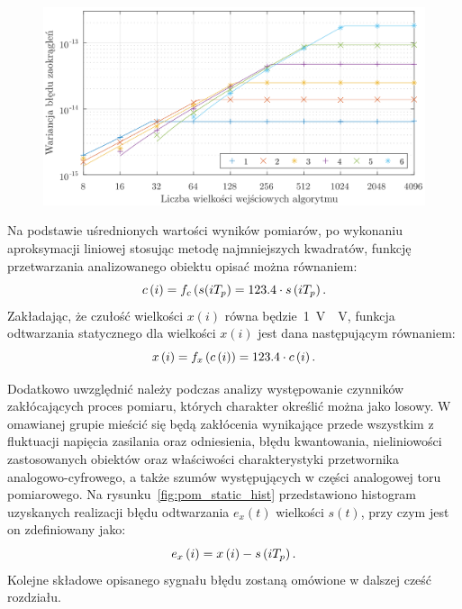 \begin{figure}[htb!]
\begin{center}
\includegraphics{obrazki/dwt_rerror_coif5}
\end{center}
\end{figure}

Na podstawie uśrednionych wartości wyników pomiarów, po wykonaniu aproksymacji liniowej stosując metodę najmniejszych kwadratów, funkcję przetwarzania analizowanego obiektu opisać można równaniem:
\begin{equation}
c \left(i\right) = f_{c} \left(s(iT_{p}\right) = 123.4 \cdot s \left(iT_{p}\right) \label{eq:pom_func_static}.
\end{equation}
Zakładając, że czułość wielkości $x(i)$ równa będzie~\qty{1}{V \per V}, funkcja odtwarzania statycznego dla wielkości $x(i)$ jest dana następującym równaniem:
\begin{equation}
x \left(i\right) = f_{x} \left(c \left(i\right)\right) = 123.4 \cdot c \left(i\right) \label{eq:pom_funx_static}.
\end{equation}

Dodatkowo uwzględnić należy podczas analizy występowanie czynników zakłócających proces pomiaru, których charakter określić można jako losowy. W omawianej grupie mieścić się będą zakłócenia wynikające przede wszystkim z fluktuacji napięcia zasilania oraz odniesienia, błędu kwantowania, nieliniowości zastosowanych obiektów oraz właściwości charakterystyki przetwornika analogowo-cyfrowego, a także szumów występujących w części analogowej toru pomiarowego. Na rysunku~\ref{fig:pom_static_hist} przedstawiono histogram uzyskanych realizacji błędu odtwarzania $e_{x}(t)$ wielkości $s(t)$, przy czym jest on zdefiniowany jako:
\begin{equation}
e_{x} \left(i\right) = x \left(i\right) - s \left(iT_{p}\right) \label{eq:pom_funx_error}.
\end{equation}
Kolejne składowe opisanego sygnału błędu zostaną omówione w dalszej cześć rozdziału.

